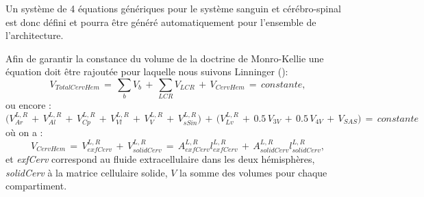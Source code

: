 Un système de 4 équations génériques pour le système sanguin et cérébro-spinal est donc
défini et pourra être généré automatiquement pour l’ensemble de l’architecture.

Afin de garantir la constance du volume de la doctrine de Monro-Kellie une équation doit être
rajoutée pour laquelle nous suivons Linninger (\cite{Linninger2009}):
\begin{equation}
V_{TotalCervHem}\,=\,\sum_b V_b\,+\,\sum_{LCR} V_{LCR}\,+\, V_{CervHem}\,=\,constante,
\end{equation}
ou encore :
\begin{equation}
\bigl(V_{Ar}^{L,R}\,+\,V_{Al}^{L,R}\,+\,V_{Cp}^{L,R}\,+\,V_{Vl}^{L,R}\,+\,V_{V}^{L,R}\,+\,V_{sSin}^{L,R}\bigr)\,+\,\bigl(V_{Lv}^{L,R}\,+\,0.5\,V_{3V}\,+\,0.5\,V_{4V}\,+\,V_{SAS}\bigr)\,=\,constante
\end{equation}
où on a :
\begin{equation}
V_{CervHem}\,=\,V_{exfCerv}^{L,R}\,+\,V_{solidCerv}^{L,R}\,=\,A_{exfCerv}^{L,R} l_{exfCerv}^{L,R}\,+\,A_{solidCerv}^{L,R} l_{solidCerv}^{L,R},
\end{equation}
et {\em exfCerv} correspond au fluide extracellulaire dans les deux hémisphères, {\em solidCerv} à la matrice
cellulaire solide, $V$ la somme des volumes pour chaque compartiment.

